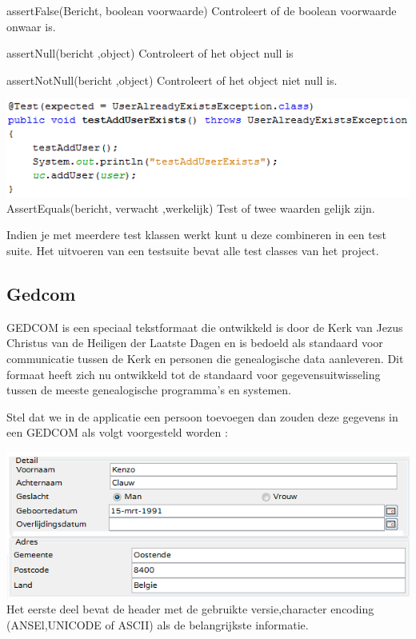 \documentclass[pdftex,a4paper,12pt,twoside]{report}
\begin{document}
assertFalse(Bericht, boolean voorwaarde)
Controleert of de boolean voorwaarde onwaar is.

assertNull(bericht ,object)
Controleert of het object null is

assertNotNull(bericht ,object)
Controleert of het object niet null is.

\includegraphics{images/junit3.png}\\

AssertEquals(bericht, verwacht ,werkelijk)
Test of twee waarden gelijk zijn.

Indien je met meerdere test klassen werkt kunt u deze combineren in een test suite.
Het uitvoeren van een testsuite bevat alle test classes van het project.




\subsection{Gedcom}

GEDCOM is een speciaal tekstformaat die ontwikkeld is door de Kerk van Jezus Christus van de Heiligen der Laatste Dagen en is bedoeld als standaard voor communicatie tussen de Kerk en personen die genealogische data aanleveren.
Dit formaat heeft zich nu ontwikkeld tot de standaard voor gegevensuitwisseling tussen de meeste genealogische programma's en systemen.

Stel dat we in de applicatie een persoon toevoegen dan zouden deze gegevens in een GEDCOM als volgt voorgesteld worden :

\includegraphics{images/gedcom.png}\\

Het eerste deel bevat de header met de gebruikte versie,character encoding (ANSEl,UNICODE of ASCII) als de belangrijkste informatie.
\end{document}
